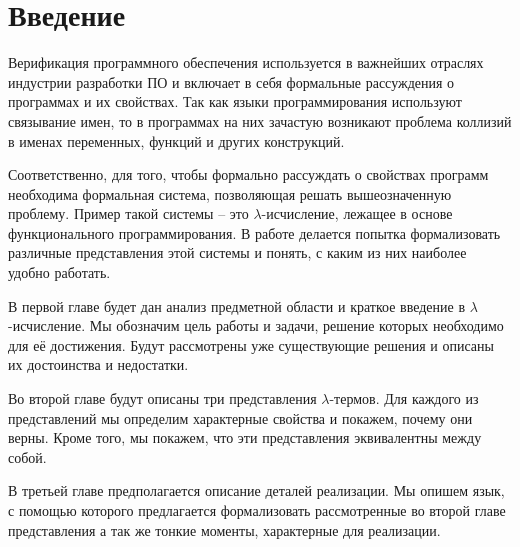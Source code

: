 \section*{Введение}

Верификация программного обеспечения используется в важнейших отраслях индустрии разработки ПО и включает в себя формальные рассуждения о программах и их свойствах. Так как языки программирования используют связывание имен, то в программах на них зачастую возникают проблема коллизий в именах переменных, функций и других конструкций.

Соответственно, для того, чтобы формально рассуждать о свойствах программ необходима формальная система, позволяющая решать вышеозначенную проблему. Пример такой системы -- это $\lambda$-исчисление, лежащее в основе функционального программирования. В работе делается попытка формализовать различные представления этой системы и понять, с каким из них наиболее удобно работать.

В первой главе будет дан анализ предметной области и краткое введение в $\lambda$-исчисление. Мы обозначим цель работы и задачи, решение которых необходимо для её достижения. Будут рассмотрены уже существующие решения и описаны их достоинства и недостатки.

Во второй главе будут описаны три представления $\lambda$-термов. Для каждого из представлений мы определим характерные свойства и покажем, почему они верны. Кроме того, мы покажем, что эти представления эквивалентны между собой.

В третьей главе предполагается описание деталей реализации. Мы опишем язык, с помощью которого предлагается формализовать рассмотренные во второй главе представления а так же тонкие моменты, характерные для реализации.
